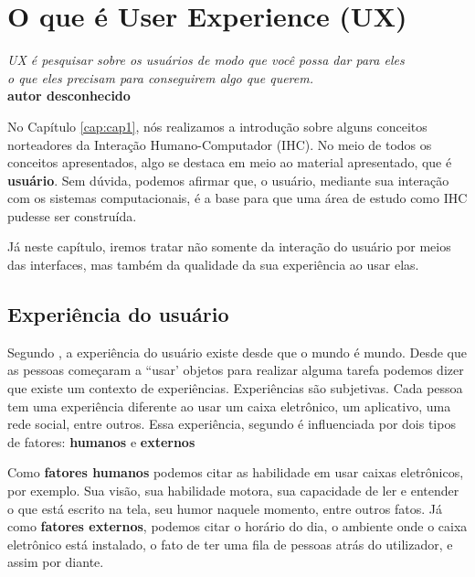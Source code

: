 \setcounter{chapter}{1}
\chapter{O que é User Experience (UX)}

\begin{flushright}
	\textit{
		UX é pesquisar sobre os usuários de modo que você possa dar para eles \\ o que eles precisam para conseguirem algo que querem.
	} \\
	
	\textbf{autor desconhecido}
\end{flushright}


No Capítulo \ref{cap:cap1}, nós realizamos a introdução sobre alguns conceitos norteadores da Interação Humano-Computador (IHC). No meio de todos os conceitos apresentados, algo se destaca em meio ao material apresentado, que é \textbf{usuário}. Sem dúvida, podemos afirmar que, o usuário, mediante sua interação com os sistemas computacionais, é a base para que uma área de estudo como IHC pudesse ser construída.

Já neste capítulo, iremos tratar não somente da interação do usuário por meios das interfaces, mas também da qualidade da sua experiência ao usar elas.

\section{Experiência do usuário}

Segundo , a experiência do usuário existe desde que o mundo é mundo. Desde que as pessoas começaram a ``usar' objetos para realizar alguma tarefa podemos dizer que existe um contexto de experiências. Experiências são subjetivas. Cada pessoa tem uma experiência diferente ao usar um caixa eletrônico, um aplicativo, uma rede social, entre outros. Essa experiência, segundo  é influenciada por dois tipos de fatores: \textbf{humanos} e \textbf{externos} 

Como \textbf{fatores humanos} podemos citar as habilidade em usar caixas eletrônicos, por exemplo. Sua visão, sua habilidade motora, sua capacidade de ler e entender o que está escrito na tela, seu humor naquele momento, entre outros fatos. Já como \textbf{fatores externos}, podemos citar o horário do dia, o ambiente onde o caixa eletrônico está instalado, o fato de ter uma fila de pessoas atrás do utilizador, e assim por diante.

